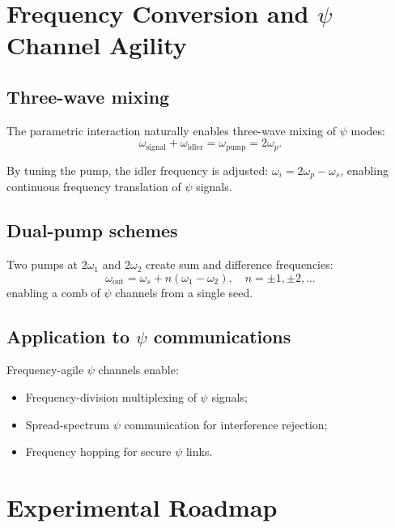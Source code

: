 \documentclass[12pt,aps,prd,twocolumn,superscriptaddress,nofootinbib]{revtex4-2}
\begin{document}
\section{Frequency Conversion and $\psi$ Channel Agility}
\label{sec:freq_conv}

\subsection{Three-wave mixing}

The parametric interaction naturally enables three-wave mixing of
$\psi$ modes:
\begin{equation}
  \omega_{\mathrm{signal}} + \omega_{\mathrm{idler}}
  = \omega_{\mathrm{pump}} = 2\omega_p.
  \label{eq:three_wave}
\end{equation}

By tuning the pump, the idler frequency is adjusted:
$\omega_i = 2\omega_p - \omega_s$, enabling continuous frequency
translation of $\psi$ signals.

\subsection{Dual-pump schemes}

Two pumps at $2\omega_1$ and $2\omega_2$ create sum and difference
frequencies:
\begin{equation}
  \omega_{\mathrm{out}} = \omega_s + n(\omega_1 - \omega_2),
  \quad n = \pm 1, \pm 2, \ldots
  \label{eq:dual_pump}
\end{equation}
enabling a comb of $\psi$ channels from a single seed.

\subsection{Application to $\psi$ communications}

Frequency-agile $\psi$ channels enable:
\begin{itemize}[noitemsep]
  \item Frequency-division multiplexing of $\psi$ signals;
  \item Spread-spectrum $\psi$ communication for interference
    rejection;
  \item Frequency hopping for secure $\psi$ links.
\end{itemize}


\section{Experimental Roadmap}
\label{sec:roadmap}
\end{document}
